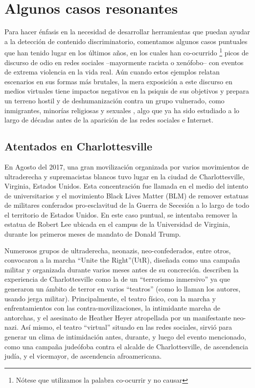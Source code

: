

\section{Algunos casos resonantes}

Para hacer énfasis en la necesidad de desarrollar herramientas que puedan ayudar a la detección de contenido discriminatorio, comentamos algunos casos puntuales que han tenido lugar en los últimos años, en los cuales han co-ocurrido \footnote{Nótese que utilizamos la palabra co-ocurrir y no causar} picos de discurso de odio en redes sociales --mayormente racista o xenófobo-- con eventos de extrema violencia en la vida real. Aún cuando estos ejemplos relatan escenarios en sus formas más brutales, la mera exposición a este discurso en medios virtuales tiene impactos negativos en la psiquis de sus objetivos \cite{saha2019prevalence} y prepara un terreno hostil y de deshumanización contra un grupo vulnerado, como inmigrantes, minorías religiosas y sexuales \cite{bilewicz2020hate}, algo que ya ha sido estudiado a lo largo de décadas antes de la aparición de las redes sociales e Internet.


\subsection{Atentados en Charlottesville}

En Agosto del 2017, una gran movilización organizada por varios movimientos de ultraderecha y supremacistas blancos tuvo lugar en la ciudad de Charlottesville, Virginia, Estados Unidos. Esta concentración fue llamada en el medio del intento de universitarios y el movimiento Black Lives Matter (BLM) de remover estatuas de militares conferados pro-esclavitud de la Guerra de Secesión a lo largo de todo el territorio de Estados Unidos. En este caso puntual, se intentaba remover la estatua de Robert Lee ubicada en el campus de la Universidad de Virginia, durante los primeros meses de mandato de Donald Trump.

Numerosos grupos de ultraderecha, neonazis, neo-confederados, entre otros, convocaron a la marcha ``Unite the Right''(UtR), diseñada como una campaña militar y organizada durante varios meses antes de su concreción. \citet{blout2020white} describen la experiencia de Charlottesville como la de un ``terrorismo inmersivo'' ya que generaron un ámbito de terror en varios ``teatros'' (como lo llaman los autores, usando jerga militar). Principalmente, el teatro físico, con la marcha y enfrentamientos con las contra-movilizaciones, la intimidante marcha de antorchas, y el asesinato de Heather Heyer atropellada por un manifestante neo-nazi. Así mismo, el teatro ``virtual'' situado en las redes sociales, sirvió para generar un clima de intimidación antes, durante, y luego del evento mencionado, como una campaña judeófoba contra el alcalde de Charlottesville, de ascendencia judía, y el vicemayor, de ascendencia afroamericana.

